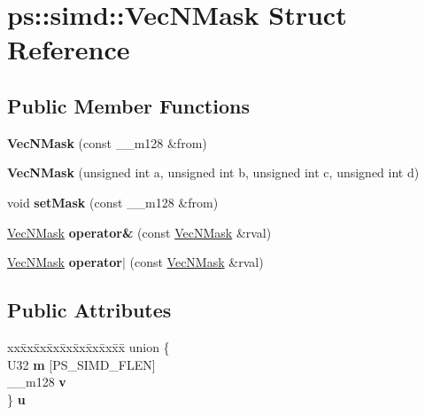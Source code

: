 \hypertarget{structps_1_1simd_1_1VecNMask}{}\section{ps\+:\+:simd\+:\+:Vec\+N\+Mask Struct Reference}
\label{structps_1_1simd_1_1VecNMask}
\subsection*{Public Member Functions}
\begin{DoxyCompactItemize}
\item 
\hypertarget{structps_1_1simd_1_1VecNMask_acf5cb9fcee20e3c85c4f1d5c37ca75fe}{}{\bfseries Vec\+N\+Mask} (const \+\_\+\+\_\+m128 \&from)\label{structps_1_1simd_1_1VecNMask_acf5cb9fcee20e3c85c4f1d5c37ca75fe}

\item 
\hypertarget{structps_1_1simd_1_1VecNMask_a725ba565728bf07c7da3e2a4826f6eaa}{}{\bfseries Vec\+N\+Mask} (unsigned int a, unsigned int b, unsigned int c, unsigned int d)\label{structps_1_1simd_1_1VecNMask_a725ba565728bf07c7da3e2a4826f6eaa}

\item 
\hypertarget{structps_1_1simd_1_1VecNMask_a465d5cd2ea308e6463a4df461c33ed48}{}void {\bfseries set\+Mask} (const \+\_\+\+\_\+m128 \&from)\label{structps_1_1simd_1_1VecNMask_a465d5cd2ea308e6463a4df461c33ed48}

\item 
\hypertarget{structps_1_1simd_1_1VecNMask_abee95ad3a3b5ca884804e9d5dcb839b1}{}\hyperlink{structps_1_1simd_1_1VecNMask}{Vec\+N\+Mask} {\bfseries operator\&} (const \hyperlink{structps_1_1simd_1_1VecNMask}{Vec\+N\+Mask} \&rval)\label{structps_1_1simd_1_1VecNMask_abee95ad3a3b5ca884804e9d5dcb839b1}

\item 
\hypertarget{structps_1_1simd_1_1VecNMask_a1b797506597ff19b3d107a0ffde1fdbd}{}\hyperlink{structps_1_1simd_1_1VecNMask}{Vec\+N\+Mask} {\bfseries operator$\vert$} (const \hyperlink{structps_1_1simd_1_1VecNMask}{Vec\+N\+Mask} \&rval)\label{structps_1_1simd_1_1VecNMask_a1b797506597ff19b3d107a0ffde1fdbd}

\end{DoxyCompactItemize}
\subsection*{Public Attributes}
\begin{DoxyCompactItemize}
\item 
\hypertarget{structps_1_1simd_1_1VecNMask_aac43a06176b2edbc56c3bb31fa199401}{}\begin{tabbing}
xx\=xx\=xx\=xx\=xx\=xx\=xx\=xx\=xx\=\kill
union \{\\
\>U32 {\bfseries m} \mbox{[}PS\_SIMD\_FLEN\mbox{]}\\
\>\_\_m128 {\bfseries v}\\
\} {\bfseries u}\label{structps_1_1simd_1_1VecNMask_aac43a06176b2edbc56c3bb31fa199401}
\\

\end{tabbing}\end{DoxyCompactItemize}
